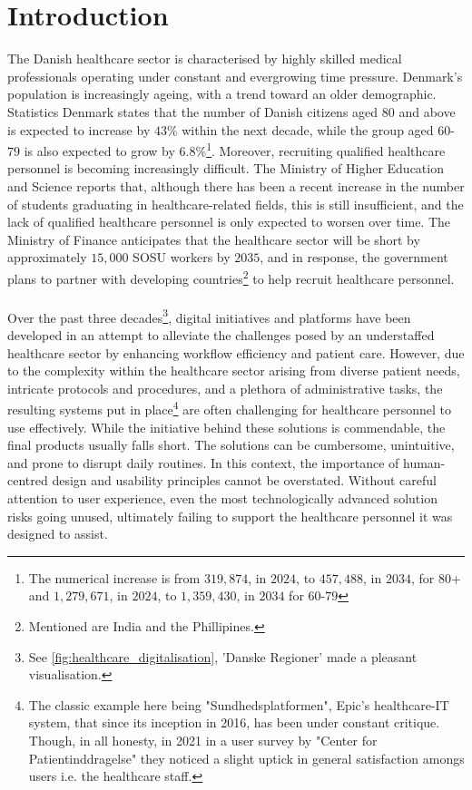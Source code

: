 \section{Introduction}
The Danish healthcare sector is characterised by highly skilled medical professionals operating under constant and evergrowing time pressure.
Denmark's population is increasingly ageing, with a trend toward an older demographic. Statistics Denmark\cite{dst-older-pop} states that the number of Danish citizens aged $80$ and above is expected to increase by $43$\% within the next decade, while the group aged $60$-$79$ is also expected to grow by $6.8$\%\footnote{The numerical increase is from $319,874$, in $2024$, to $457,488$, in $2034$, for $80$+ and $1,279,671$, in $2024$, to $1,359,430$, in $2034$ for $60$-$79$}. Moreover, recruiting qualified healthcare personnel is becoming increasingly difficult. The Ministry of Higher Education and Science\cite{MoHEaS-healthcare-rectruitment} reports that, although there has been a recent increase in the number of students graduating in healthcare-related fields, this is still insufficient, and the lack of qualified healthcare personnel is only expected to worsen over time. The Ministry of Finance\cite{MoHEaS-healthcare-rectruitment} anticipates that the healthcare sector will be short by approximately $15,000$ SOSU workers by $2035$, and in response, the government plans to partner with developing countries\footnote{Mentioned are India and the Phillipines.} to help recruit healthcare personnel.
\\
\\
Over the past three decades\footnote{See \autoref{fig:healthcare_digitalisation}, 'Danske Regioner' made a pleasant visualisation.}, digital initiatives and platforms have been developed in an attempt to alleviate the challenges posed by an understaffed healthcare sector by enhancing workflow efficiency and patient care. However, due to the complexity within the healthcare sector arising from diverse patient needs, intricate protocols and procedures, and a plethora of administrative tasks, the resulting systems put in place\footnote{The classic example here being "Sundhedsplatformen", Epic's healthcare-IT system, that since its inception in 2016, has been under constant critique\cite{DR-healthcare-platform, Altinget-healthcare-platform, TV2-healthcare-platform}. Though, in all honesty, in 2021 in a user survey by "Center for Patientinddragelse"\cite{SP-user-survey} they noticed a slight uptick in general satisfaction amongs users i.e. the healthcare staff.} are often challenging for healthcare personnel to use effectively. While the initiative behind these solutions is commendable, the final products usually falls short. The solutions can be cumbersome, unintuitive, and prone to disrupt daily routines. In this context, the importance of human-centred design and usability principles cannot be overstated. Without careful attention to user experience, even the most technologically advanced solution risks going unused, ultimately failing to support the healthcare personnel it was designed to assist.


